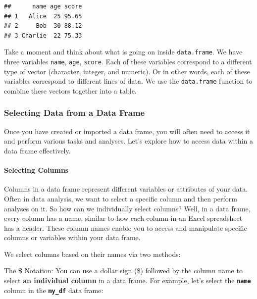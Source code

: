 \documentclass[
]{book}
\newenvironment{Shaded}{\begin{snugshade}}{\end{snugshade}}
\newcommand{\NormalTok}[1]{#1}
\newcommand{\SpecialCharTok}[1]{\textcolor[rgb]{0.81,0.36,0.00}{\textbf{#1}}}
\begin{document}
\begin{verbatim}
##      name age score
## 1   Alice  25 95.65
## 2     Bob  30 88.12
## 3 Charlie  22 75.33
\end{verbatim}

Take a moment and think about what is going on inside \texttt{data.frame}. We have three variables \texttt{name}, \texttt{age}, \texttt{score}. Each of these variables correspond to a different type of vector (character, integer, and numeric). Or in other words, each of these variables correspond to different lines of data. We use the \texttt{data.frame} function to combine these vectors together into a table.

\subsubsection{Selecting Data from a Data Frame}\label{selecting-data-from-a-data-frame}

Once you have created or imported a data frame, you will often need to access it and perform various tasks and analyses. Let's explore how to access data within a data frame effectively.

\paragraph{Selecting Columns}\label{selecting-columns}

Columns in a data frame represent different variables or attributes of your data. Often in data analysis, we want to select a specific column and then perform analyses on it. So how can we individually select columns? Well, in a data frame, every column has a name, similar to how each column in an Excel spreadsheet has a header. These column names enable you to access and manipulate specific columns or variables within your data frame.

We select columns based on their names via two methods:

The \textbf{\$} Notation: You can use a dollar sign (\$) followed by the column name to select \textbf{an individual column} in a data frame. For example, let's select the \textbf{\texttt{name}} column in the \textbf{\texttt{my\_df}} data frame:

\begin{Shaded}
\end{Shaded}
\end{document}
